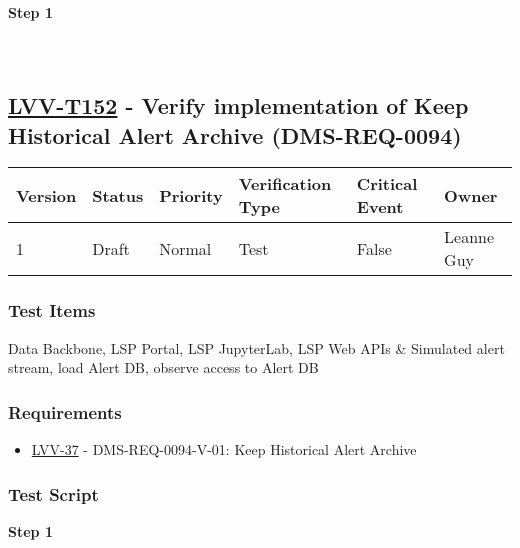 \textbf{Step 1}\\
~\\
~\\

\hypertarget{lvv-t152---verify-implementation-of-keep-historical-alert-archive-dms-req-0094}{%
\subsection{\texorpdfstring{\href{https://jira.lsstcorp.org/secure/Tests.jspa\#/testCase/LVV-T152}{LVV-T152}
- Verify implementation of Keep Historical Alert Archive
(DMS-REQ-0094)}{LVV-T152 - Verify implementation of Keep Historical Alert Archive (DMS-REQ-0094)}}\label{lvv-t152---verify-implementation-of-keep-historical-alert-archive-dms-req-0094}}

\begin{longtable}[]{@{}llllll@{}}
\toprule
Version & Status & Priority & Verification Type & Critical Event &
Owner\tabularnewline
\midrule
\endhead
1 & Draft & Normal & Test & False & Leanne Guy\tabularnewline
\bottomrule
\end{longtable}

\hypertarget{test-items-128}{%
\subsubsection{Test Items}\label{test-items-128}}

Data Backbone, LSP Portal, LSP JupyterLab, LSP Web APIs \& Simulated
alert stream, load Alert DB, observe access to Alert DB

\hypertarget{requirements-129}{%
\subsubsection{Requirements}\label{requirements-129}}

\begin{itemize}
\tightlist
\item
  \href{https://jira.lsstcorp.org/browse/LVV-37}{LVV-37} -
  DMS-REQ-0094-V-01: Keep Historical Alert Archive
\end{itemize}

\hypertarget{test-script-129}{%
\subsubsection{Test Script}\label{test-script-129}}

\textbf{Step 1}\\
~\\
~\\

